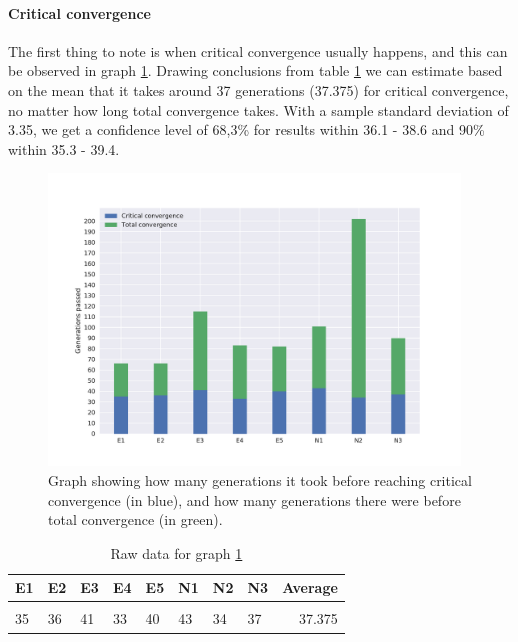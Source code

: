 \documentclass[a4paper,english]{report}
\begin{document}
	\paragraph{Critical convergence} The first thing to note is when critical convergence usually happens, and this can be observed in graph \ref{fig:criticalconv}. Drawing conclusions from table \ref{table:criticalconv} we can estimate based on the mean that it takes around 37 generations (37.375) for critical convergence, no matter how long total convergence takes. With a sample standard deviation of 3.35, we get a confidence level of 68,3\% for results within 36.1 - 38.6 and 90\% within 35.3 - 39.4.
	\begin{figure}[H]
		\centering
		\includegraphics[width=310pt]{criticalcon1}
		\caption{Graph showing how many generations it took before reaching critical convergence (in blue), and how many generations there were before total convergence (in green).}
		\label{fig:criticalconv}
	\end{figure}
	\begin{table}[H]
		\centering
		\caption{Raw data for graph \ref{fig:criticalconv}}
		\label{table:criticalconv}
		\begin{tabular}{llllllll|r}
			\\
			\textbf{E1} & \textbf{E2} & \textbf{E3} & \textbf{E4} & \textbf{E5} & \textbf{N1} & \textbf{N2} & \textbf{N3} & \textbf{Average} \\ \hline \\
			35 & 36 & 41 & 33 & 40 & 43 & 34 & 37 & 37.375 \\
		\end{tabular}
	\end{table}
\end{document}
